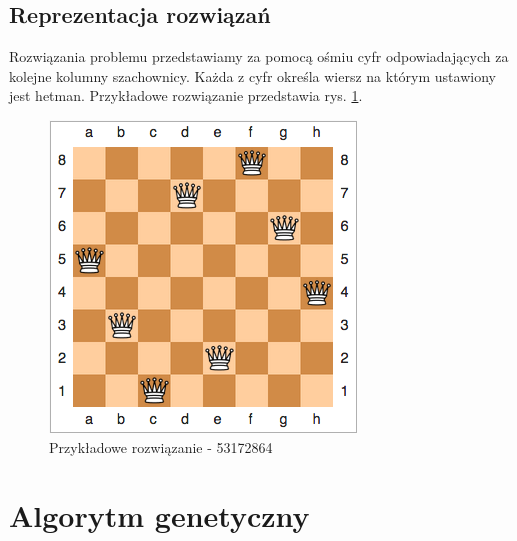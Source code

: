 \documentclass[12pt, twoside]{article}
\begin{document}
\subsection{Reprezentacja rozwiązań}
Rozwiązania problemu przedstawiamy za pomocą ośmiu cyfr odpowiadających za kolejne kolumny szachownicy. Każda z cyfr określa wiersz na którym ustawiony jest hetman. Przykładowe rozwiązanie przedstawia rys. \ref{fig:example}.

\begin{figure}[H]
    \centering
    \includegraphics[keepaspectratio=true, scale=0.7]{example-53172864.png}
    \caption{Przykładowe rozwiązanie - 53172864}
    \label{fig:example}
\end{figure}

\clearpage
\section{Algorytm genetyczny}
\end{document}
